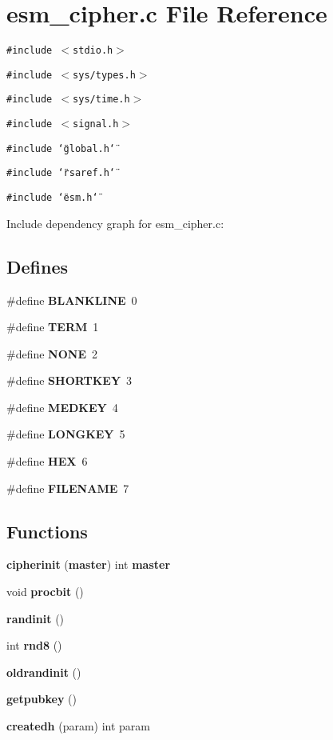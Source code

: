 \section{esm\_\-cipher.c File Reference}
\label{esm__cipher_8c}


{\tt \#include $<$stdio.h$>$}\par
{\tt \#include $<$sys/types.h$>$}\par
{\tt \#include $<$sys/time.h$>$}\par
{\tt \#include $<$signal.h$>$}\par
{\tt \#include \char`\"{}global.h\char`\"{}}\par
{\tt \#include \char`\"{}rsaref.h\char`\"{}}\par
{\tt \#include \char`\"{}esm.h\char`\"{}}\par


Include dependency graph for esm\_\-cipher.c:\subsection*{Defines}
\begin{CompactItemize}
\item 
\#define {\bf BLANKLINE}\ 0
\item 
\#define {\bf TERM}\ 1
\item 
\#define {\bf NONE}\ 2
\item 
\#define {\bf SHORTKEY}\ 3
\item 
\#define {\bf MEDKEY}\ 4
\item 
\#define {\bf LONGKEY}\ 5
\item 
\#define {\bf HEX}\ 6
\item 
\#define {\bf FILENAME}\ 7
\end{CompactItemize}
\subsection*{Functions}
\begin{CompactItemize}
\item 
{\bf cipherinit} ({\bf master}) int {\bf master}
\item 
void {\bf procbit} ()
\item 
{\bf randinit} ()
\item 
int {\bf rnd8} ()
\item 
{\bf oldrandinit} ()
\item 
{\bf getpubkey} ()
\item 
{\bf createdh} (param) int param
\end{CompactItemize}
